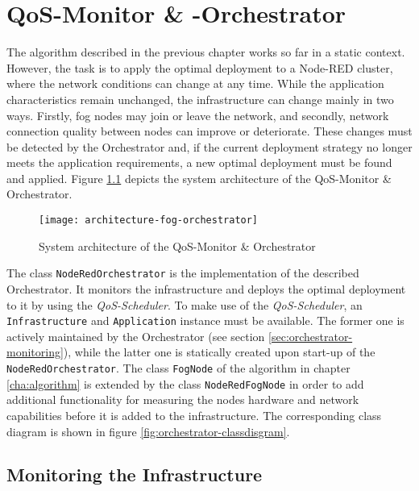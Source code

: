 \chapter{QoS-Monitor \& -Orchestrator\label{cha:orchestrator}}

The algorithm described in the previous chapter works so far in a static context.
However, the task is to apply the optimal deployment to a Node-RED cluster, where the network conditions can change at any time. While the application characteristics remain unchanged, the infrastructure can change mainly in two ways. Firstly, fog nodes may join or leave the network, and secondly, network connection quality between nodes can improve or deteriorate. These changes must be detected by the Orchestrator and, if the current deployment strategy no longer meets the application requirements, a new optimal deployment must be found and applied. Figure \ref{fig:orchestrator-system-architecture} depicts the system architecture of the QoS-Monitor \& Orchestrator.

\begin{figure}[h!]
    \centering
    \texttt{[image: architecture-fog-orchestrator]}
    \caption{System architecture of the QoS-Monitor \& Orchestrator}
    \label{fig:orchestrator-system-architecture}
\end{figure}

The class \texttt{NodeRedOrchestrator} is the implementation of the described Orchestrator.
It monitors the infrastructure and deploys the optimal deployment to it by using the \textit{QoS-Scheduler}.
To make use of the \textit{QoS-Scheduler}, an \mbox{\texttt{Infrastructure}} and \mbox{\texttt{Application}} instance must be available. The former one is actively maintained by the Orchestrator (see section \ref{sec:orchestrator-monitoring}), while the latter one is statically created upon start-up of the \texttt{NodeRedOrchestrator}.
The class \texttt{FogNode} of the algorithm in chapter \ref{cha:algorithm} is extended by the class \texttt{NodeRedFogNode} in order to add additional functionality for measuring the nodes hardware and network capabilities before it is added to the infrastructure.
The corresponding class diagram is shown in figure \ref{fig:orchestrator-classdisgram}.

\section{Monitoring the Infrastructure\label{sec:orchestrator-monitoring}}

